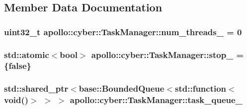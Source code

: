 \subsection{Member Data Documentation}
\hypertarget{classapollo_1_1cyber_1_1TaskManager_a7b3621cc356abfb846a781b9834b6fa6}{
\subsubsection[{num\-\_\-threads\-\_\-}]{\setlength{\rightskip}{0pt plus 5cm}uint32\-\_\-t apollo\-::cyber\-::\-Task\-Manager\-::num\-\_\-threads\-\_\- = 0\hspace{0.3cm}{\ttfamily [private]}}}\label{classapollo_1_1cyber_1_1TaskManager_a7b3621cc356abfb846a781b9834b6fa6}
\hypertarget{classapollo_1_1cyber_1_1TaskManager_a8893ed8020b9deec8dd6ac1ea4dd5409}{
\subsubsection[{stop\-\_\-}]{\setlength{\rightskip}{0pt plus 5cm}std\-::atomic$<$bool$>$ apollo\-::cyber\-::\-Task\-Manager\-::stop\-\_\- = \{false\}\hspace{0.3cm}{\ttfamily [private]}}}\label{classapollo_1_1cyber_1_1TaskManager_a8893ed8020b9deec8dd6ac1ea4dd5409}
\hypertarget{classapollo_1_1cyber_1_1TaskManager_a9359f41900a726d1270bbf628ec2923b}{
\subsubsection[{task\-\_\-queue\-\_\-}]{\setlength{\rightskip}{0pt plus 5cm}std\-::shared\-\_\-ptr$<${\bf base\-::\-Bounded\-Queue}$<$std\-::function$<$void()$>$ $>$ $>$ apollo\-::cyber\-::\-Task\-Manager\-::task\-\_\-queue\-\_\-\hspace{0.3cm}{\ttfamily [private]}}}\label{classapollo_1_1cyber_1_1TaskManager_a9359f41900a726d1270bbf628ec2923b}

